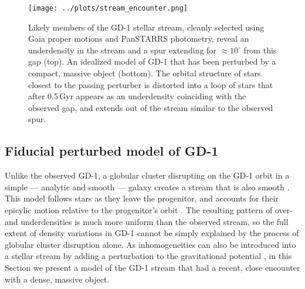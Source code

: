 \documentclass[12pt, modern]{aastex62}
\begin{document}
\begin{figure}
\begin{center}
\texttt{[image: ../plots/stream\_encounter.png]}
\end{center}
\caption{Likely members of the GD-1 stellar stream, cleanly selected using Gaia proper motions and PanSTARRS photometry, reveal an underdensity in the stream and a spur extending for $\approx10^\circ$ from this gap (top).
An idealized model of GD-1 that has been perturbed by a compact, massive object (bottom).
The orbital structure of stars closest to the passing perturber is distorted into a loop of stars that after 0.5\,Gyr appears as an underdensity coinciding with the observed gap, and extends out of the stream similar to the observed spur.
}
\label{fig:fiducial}
\end{figure}

\subsection{Fiducial perturbed model of GD-1}
\label{sec:model}
Unlike the observed GD-1, a globular cluster disrupting on the GD-1 orbit in a simple --- analytic and smooth --- galaxy creates a stream that is also smooth \citep{pwb}.
This model follows stars as they leave the progenitor, and accounts for their epicylic motion relative to the progenitor's orbit \citep{kupper2008, kupper2010, fardal2015}.
The resulting pattern of over- and underdensities is much more uniform than the observed stream, so the full extent of density variations in GD-1 cannot be simply explained by the process of globular cluster disruption alone.
As inhomogeneities can also be introduced into a stellar stream by adding a perturbation to the gravitational potential \citep[e.g.,][]{sgv2008}, in this Section we present a model of the GD-1 stream that had a recent, close encounter with a dense, massive object.
\end{document}
